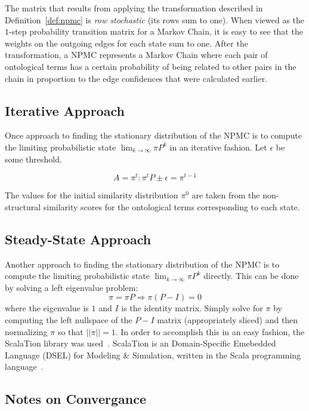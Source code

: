 \documentclass[letterpaper,twocolumn,12pt]{article}
\begin{document}
\noindent The matrix that results from applying the transformation described in Definition~\ref{def:npmc} is \textit{row stochastic} (its rows sum to one).
When viewed as the $1$-step probability transition matrix for a Markov Chain, it is easy to see that the weights on the outgoing edges for each state sum to one.
After the transformation, a NPMC represents a Markov Chain where each pair of ontological terms has a certain probability of being related to other pairs in the chain in proportion to the edge confidences that were calculated earlier.

\subsection{Iterative Approach}

Once approach to finding the stationary distribution of the NPMC is to compute the limiting probabilistic state $\lim_{k \to \infty} \pi P^k$ in an iterative fashion. 
Let $\epsilon$ be some threshold.

$$ A = \pi^t : \pi^t P \pm \epsilon = \pi^{t-1} $$

\noindent The values for the initial similarity distribution $\pi^0$ are taken from the non-structural similarity scores for the ontological terms corresponding to each state.

\subsection{Steady-State Approach}

Another approach to finding the stationary distribution of the NPMC is to compute the limiting probabilistic state $\lim_{k \to \infty} \pi P^k$ directly.
This can be done by solving a left eigenvalue problem: 
$$ \pi = \pi P \Rightarrow \pi (P - I) = 0$$
where the eigenvalue is $1$ and $I$ is the identity matrix. 
Simply solve for $\pi$ by computing the left nullspace of the $P - I$ matrix (appropriately sliced) and then normalizing $\pi$ so that $\vert\vert \pi \vert\vert = 1$.
In order to accomplish this in an easy fashion, the ScalaTion library was used~\cite{miller:2010:scalation}. ScalaTion is an Domain-Specific Emebedded Language (DSEL) for Modeling \& Simulation, written in the Scala programming language~\cite{odersky:2011:spec}.

\subsection{Notes on Convergance}
\end{document}
